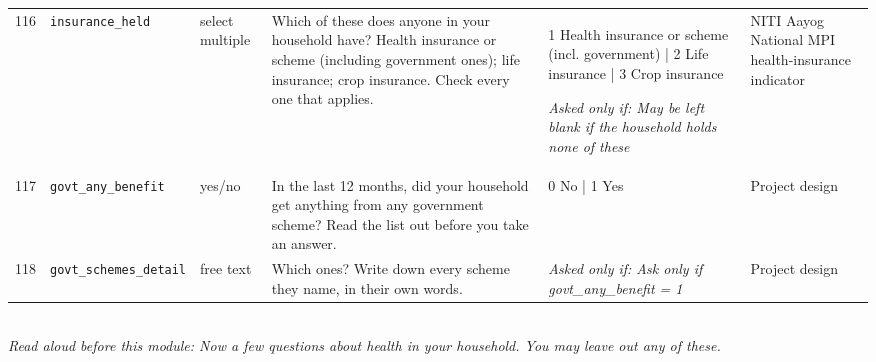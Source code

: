 \documentclass[9pt,a4paper,landscape]{article}
\begin{document}
\begin{longtable}{@{}p{0.5cm}p{3.3cm}p{1.7cm}p{7.3cm}p{5.6cm}p{5.4cm}@{}}
\footnotesize 116 & \footnotesize\texttt{insurance\_held} & \scriptsize select multiple & \footnotesize Which of these does anyone in your household have? Health insurance or scheme (including government ones); life insurance; crop insurance. Check every one that applies.\par\vspace{1pt}{\footnotesize\color{hdr}{\hifont आपके घर में किसी के पास इनमें से क्या है? स्वास्थ्य बीमा या योजना (सरकारी भी); जीवन बीमा; फ़सल बीमा। जो लागू हो, वो सब चुनें।}} & \scriptsize 1 Health insurance or scheme (incl. government) | 2 Life insurance | 3 Crop insurance\par\vspace{1pt}\textit{Asked only if: May be left blank if the household holds none of these} & \scriptsize NITI Aayog National MPI health-insurance indicator\\
\footnotesize 117 & \footnotesize\texttt{govt\_any\_benefit} & \scriptsize yes/no & \footnotesize In the last 12 months, did your household get anything from any government scheme? Read the list out before you take an answer.\par\vspace{1pt}{\footnotesize\color{hdr}{\hifont पिछले 12 महीनों में क्या आपके घर को किसी सरकारी योजना से कुछ मिला? जवाब लेने से पहले सूची पढ़कर सुनाइए।}} & \scriptsize 0 No | 1 Yes & \scriptsize Project design\\
\footnotesize 118 & \footnotesize\texttt{govt\_schemes\_detail} & \scriptsize free text & \footnotesize Which ones? Write down every scheme they name, in their own words.\par\vspace{1pt}{\footnotesize\color{hdr}{\hifont कौन-कौन सी? वे जितनी योजनाएँ बताएँ, सब उन्हीं के शब्दों में लिख लीजिए।}} & \scriptsize \textit{Asked only if: Ask only if govt\_any\_benefit = 1} & \scriptsize Project design\\
\bottomrule\end{longtable}\vspace{6pt}
\\[3pt]
{\small\itshape Read aloud before this module: Now a few questions about health in your household. You may leave out any of these.}\\[5pt]
\end{document}
